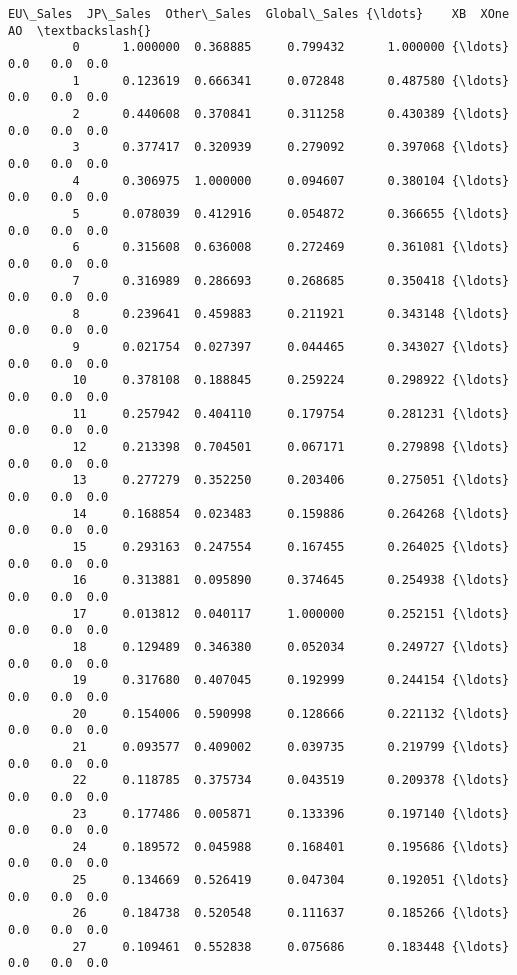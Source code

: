\documentclass[11pt]{article}
\begin{document}
\begin{Verbatim}[commandchars=\\\{\}]
                EU\_Sales  JP\_Sales  Other\_Sales  Global\_Sales {\ldots}    XB  XOne   AO  \textbackslash{}
         0      1.000000  0.368885     0.799432      1.000000 {\ldots}   0.0   0.0  0.0   
         1      0.123619  0.666341     0.072848      0.487580 {\ldots}   0.0   0.0  0.0   
         2      0.440608  0.370841     0.311258      0.430389 {\ldots}   0.0   0.0  0.0   
         3      0.377417  0.320939     0.279092      0.397068 {\ldots}   0.0   0.0  0.0   
         4      0.306975  1.000000     0.094607      0.380104 {\ldots}   0.0   0.0  0.0   
         5      0.078039  0.412916     0.054872      0.366655 {\ldots}   0.0   0.0  0.0   
         6      0.315608  0.636008     0.272469      0.361081 {\ldots}   0.0   0.0  0.0   
         7      0.316989  0.286693     0.268685      0.350418 {\ldots}   0.0   0.0  0.0   
         8      0.239641  0.459883     0.211921      0.343148 {\ldots}   0.0   0.0  0.0   
         9      0.021754  0.027397     0.044465      0.343027 {\ldots}   0.0   0.0  0.0   
         10     0.378108  0.188845     0.259224      0.298922 {\ldots}   0.0   0.0  0.0   
         11     0.257942  0.404110     0.179754      0.281231 {\ldots}   0.0   0.0  0.0   
         12     0.213398  0.704501     0.067171      0.279898 {\ldots}   0.0   0.0  0.0   
         13     0.277279  0.352250     0.203406      0.275051 {\ldots}   0.0   0.0  0.0   
         14     0.168854  0.023483     0.159886      0.264268 {\ldots}   0.0   0.0  0.0   
         15     0.293163  0.247554     0.167455      0.264025 {\ldots}   0.0   0.0  0.0   
         16     0.313881  0.095890     0.374645      0.254938 {\ldots}   0.0   0.0  0.0   
         17     0.013812  0.040117     1.000000      0.252151 {\ldots}   0.0   0.0  0.0   
         18     0.129489  0.346380     0.052034      0.249727 {\ldots}   0.0   0.0  0.0   
         19     0.317680  0.407045     0.192999      0.244154 {\ldots}   0.0   0.0  0.0   
         20     0.154006  0.590998     0.128666      0.221132 {\ldots}   0.0   0.0  0.0   
         21     0.093577  0.409002     0.039735      0.219799 {\ldots}   0.0   0.0  0.0   
         22     0.118785  0.375734     0.043519      0.209378 {\ldots}   0.0   0.0  0.0   
         23     0.177486  0.005871     0.133396      0.197140 {\ldots}   0.0   0.0  0.0   
         24     0.189572  0.045988     0.168401      0.195686 {\ldots}   0.0   0.0  0.0   
         25     0.134669  0.526419     0.047304      0.192051 {\ldots}   0.0   0.0  0.0   
         26     0.184738  0.520548     0.111637      0.185266 {\ldots}   0.0   0.0  0.0   
         27     0.109461  0.552838     0.075686      0.183448 {\ldots}   0.0   0.0  0.0   

\end{Verbatim}
\end{document}
